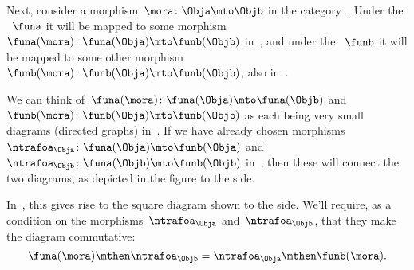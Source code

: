 \begin{marginfigure}
    \hfill
\end{marginfigure}

Next, consider a morphism~$\mora \colon \Obja \mto \Objb$ in the category~\CatC.
Under the ~$\funa$ it will be mapped to some morphism~$\funa(\mora)\colon \funa(\Obja) \mto \funb(\Objb)$ in~\CatD, and under the ~$\funb$ it will be mapped to some other morphism~$\funb(\mora)\colon \funb(\Obja) \mto \funb(\Objb)$, also in~\CatD.

\vspace{5mm}
\begin{marginfigure}
    \hfill
\end{marginfigure}

We can think of~$\funa(\mora)\colon \funa(\Obja) \mto \funa(\Objb)$ and~$\funb(\mora)\colon \funb(\Obja) \mto \funb(\Objb)$ as each being very small diagrams (directed graphs) in~\CatD.
If we have already chosen morphisms~$\ntrafoa_\Obja\colon \funa(\Obja) \mto \funb(\Obja)$ and~$\ntrafoa_\Objb\colon \funa(\Objb) \mto \funb(\Objb)$ in~\CatD, then these will connect the two diagrams, as depicted in the figure to the side.
%

\vspace{7mm}

%
\begin{marginfigure}
    \hfill
    \caption{}
    \label{fig:naturality-square}
\end{marginfigure}

In~\CatD, this gives rise to the square diagram shown to the side.
We'll require, as a condition on the morphisms~$\ntrafoa_\Obja$ and~$\ntrafoa_\Objb$, that they make the diagram commutative:
\begin{equation}
    \funa(\mora) \mthen \ntrafoa_\Objb = \ntrafoa_\Obja \mthen \funb(\mora).
\end{equation}

